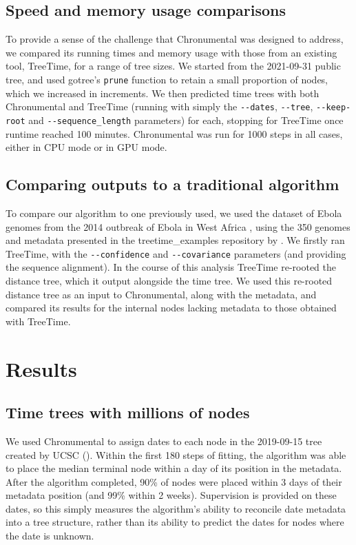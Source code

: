 \subsection*{Speed and memory usage comparisons}
To provide a sense of the challenge that Chronumental was designed to address, we compared its running times and memory usage with those from an existing tool, TreeTime, for a range of tree sizes. We started from the 2021-09-31 public tree, and used gotree's \texttt{prune} function \citep{gotree} to retain a small proportion of nodes, which we increased in increments. We then predicted time trees with both Chronumental and TreeTime (running with simply the \texttt{-{}-dates}, \texttt{-{}-tree}, \texttt{-{}-keep-root} and \texttt{-{}-sequence\_length} parameters) for each, stopping for TreeTime once runtime reached 100 minutes. Chronumental was run for 1000 steps in all cases, either in CPU mode or in GPU mode.


\subsection*{Comparing outputs to a traditional algorithm}

To compare our algorithm to one previously used, we used the dataset of Ebola genomes from the 2014 outbreak of Ebola in West Africa  \citep{Dudas2017-km}, using the 350 genomes and metadata presented in the treetime\_examples repository by \citet{Sagulenko2018-kr}. We firstly ran TreeTime, with the \texttt{-{}-confidence} and \texttt{-{}-covariance} parameters (and providing the sequence alignment). In the course of this analysis TreeTime re-rooted the distance tree, which it output alongside the time tree. We used this re-rooted distance tree as an input to Chronumental, along with the metadata, and compared its results for the internal nodes lacking metadata to those obtained with TreeTime.


\section*{Results}



\subsection*{Time trees with millions of nodes}

We used Chronumental to assign dates to each node in the 2019-09-15 tree created by UCSC (). Within the first 180 steps of fitting, the algorithm was able to place the median terminal node within a day of its position in the metadata. After the algorithm completed, 90\% of nodes were placed within 3 days of their metadata position (and 99\% within 2 weeks). Supervision is provided on these dates, so this simply measures the algorithm's ability to reconcile date metadata into a tree structure, rather than its ability to predict the dates for nodes where the date is unknown.

